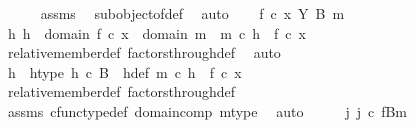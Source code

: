 \begin{isabellebody}
\ \ \ \ \isamarkupfalse%
\ assms{\isacharparenleft}{\kern0pt}{}{\isacharparenright}{\kern0pt}\ \isamarkupfalse%
\ subobject{\isacharunderscore}{\kern0pt}of{\isacharunderscore}{\kern0pt}def{}\ \isamarkupfalse%
\ auto\isanewline
\isanewline
\ \ \isamarkupfalse%
\ {\isachardoublequoteopen}f\ {\isasymcirc}\isactrlsub c\ x\ {\isasymin}\isactrlbsub Y\isactrlesub \ {\isacharparenleft}{\kern0pt}B{\isacharcomma}{\kern0pt}\ m{\isacharparenright}{\kern0pt}{\isachardoublequoteclose}\isanewline
\ \ \isamarkupfalse%
\ \isamarkupfalse%
\ {\isachardoublequoteopen}{\isasymexists}h{\isachardot}{\kern0pt}\ h\ {\isacharcolon}{\kern0pt}\ domain\ {\isacharparenleft}{\kern0pt}f\ {\isasymcirc}\isactrlsub c\ x{\isacharparenright}{\kern0pt}\ {\isasymrightarrow}\ domain\ m\ {\isasymand}\ m\ {\isasymcirc}\isactrlsub c\ h\ {\isacharequal}{\kern0pt}\ f\ {\isasymcirc}\isactrlsub c\ x{\isachardoublequoteclose}\isanewline
\ \ \ \ \isamarkupfalse%
\ relative{\isacharunderscore}{\kern0pt}member{\isacharunderscore}{\kern0pt}def{}\ factors{\isacharunderscore}{\kern0pt}through{\isacharunderscore}{\kern0pt}def\ \isamarkupfalse%
\ auto\isanewline
\ \ \isamarkupfalse%
\ \isamarkupfalse%
\ h\ \ h{\isacharunderscore}{\kern0pt}type{\isacharcolon}{\kern0pt}\ {\isachardoublequoteopen}h\ {\isasymin}\isactrlsub c\ B{\isachardoublequoteclose}\ \ h{\isacharunderscore}{\kern0pt}def{\isacharcolon}{\kern0pt}\ {\isachardoublequoteopen}m\ {\isasymcirc}\isactrlsub c\ h\ {\isacharequal}{\kern0pt}\ f\ {\isasymcirc}\isactrlsub c\ x{\isachardoublequoteclose}\isanewline
\ \ \ \ \isamarkupfalse%
\ relative{\isacharunderscore}{\kern0pt}member{\isacharunderscore}{\kern0pt}def{}\ factors{\isacharunderscore}{\kern0pt}through{\isacharunderscore}{\kern0pt}def\ \isanewline
\ \ \ \ \isamarkupfalse%
\ assms\ cfunc{\isacharunderscore}{\kern0pt}type{\isacharunderscore}{\kern0pt}def\ domain{\isacharunderscore}{\kern0pt}comp\ m{\isacharunderscore}{\kern0pt}type\ \isamarkupfalse%
\ auto\isanewline
\ \ \isamarkupfalse%
\ \isamarkupfalse%
\ {\isachardoublequoteopen}{\isasymexists}j{\isachardot}{\kern0pt}\ j\ {\isasymin}\isactrlsub c\ {\isacharparenleft}{\kern0pt}f\isactrlsup {\isacharminus}{\kern0pt}B{\isasymrparr}\isactrlbsub m\isactrlesub {\isacharparenright}{\kern0pt}\ {\isasymand}\isanewline

\end{isabellebody}
